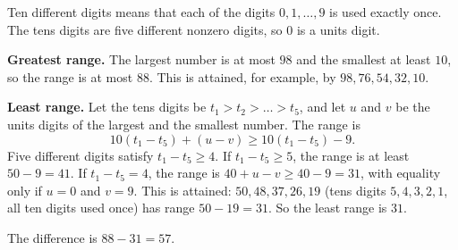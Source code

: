 Ten different digits means that each of the digits $0,1,\dots,9$ is used exactly once. The tens digits are five different nonzero digits, so $0$ is a units digit.

\textbf{Greatest range.} The largest number is at most $98$ and the smallest at least $10$, so the range is at most $88$. This is attained, for example, by $98,76,54,32,10$.

\textbf{Least range.} Let the tens digits be $t_1>t_2>\dots>t_5$, and let $u$ and $v$ be the units digits of the largest and the smallest number. The range is
\[
10(t_1-t_5)+(u-v)\ge10(t_1-t_5)-9 .
\]
Five different digits satisfy $t_1-t_5\ge4$. If $t_1-t_5\ge5$, the range is at least $50-9=41$. If $t_1-t_5=4$, the range is $40+u-v\ge40-9=31$, with equality only if $u=0$ and $v=9$. This is attained: $50,48,37,26,19$ (tens digits $5,4,3,2,1$, all ten digits used once) has range $50-19=31$. So the least range is $31$.

The difference is $88-31=\boxed{57}$.
